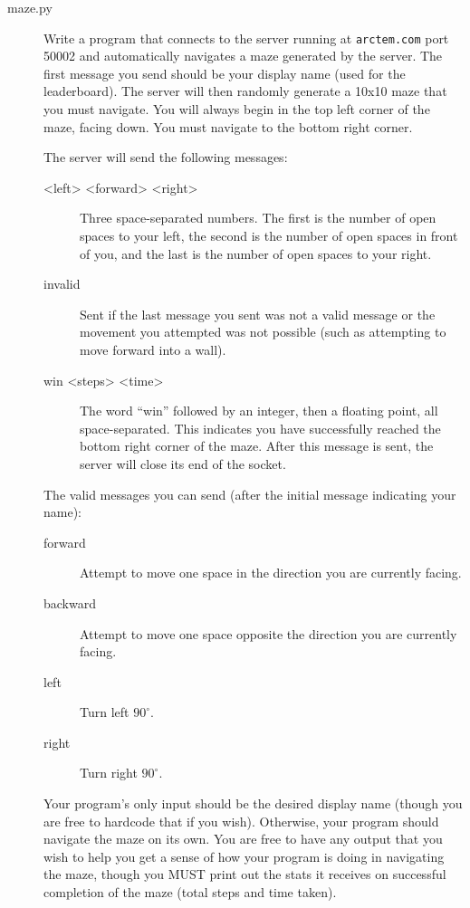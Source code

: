 \documentclass[11pt]{cselabheader}
\begin{document}
\begin{description}
\item[maze.py] Write a program that connects to the server running at \lstinline{arctem.com} port 50002
  and automatically navigates a maze generated by the server. The first message you send should be
  your display name (used for the leaderboard). The server will then randomly generate a 10x10
  maze that you must navigate. You will always begin in the top left corner of the maze, facing
  down. You must navigate to the bottom right corner.

  The server will send the following messages:

  \begin{description}
  \item[<left> <forward> <right>] Three space-separated numbers. The first is the number of open
    spaces to your left, the second is the number of open spaces in front of you, and the last is
    the number of open spaces to your right.
  \item[invalid] Sent if the last message you sent was not a valid message or the movement you
    attempted was not possible (such as attempting to move forward into a wall).
  \item[win <steps> <time>] The word ``win'' followed by an integer, then a floating point,
    all space-separated. This indicates you have successfully reached the bottom right corner of
    the maze. After this message is sent, the server will close its end of the socket.
  \end{description}

  The valid messages you can send (after the initial message indicating your name):

  \begin{description}
  \item[forward] Attempt to move one space in the direction you are currently facing.
  \item[backward] Attempt to move one space opposite the direction you are currently facing.
  \item[left] Turn left $90^{\circ}$.
  \item[right] Turn right $90^{\circ}$.
  \end{description}

  Your program's only input should be the desired display name (though you are free to hardcode
  that if you wish). Otherwise, your program should navigate the maze on its own. You are free
  to have any output that you wish to help you get a sense of how your program is doing in
  navigating the maze, though you MUST print out the stats it receives on successful completion of
  the maze (total steps and time taken).


\end{description}
\end{document}
